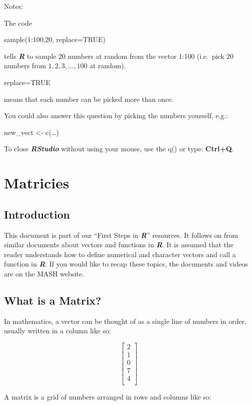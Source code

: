 \documentclass[
]{book}
\begin{document}
Notes:

The code

sample(1:100,20, replace=TRUE)

tells \textbf{\emph{R}} to sample \(20\) numbers at random from the vector 1:100 (i.e.~pick \(20\) numbers from \(1, 2, 3, \ldots , 100\) at random).

replace=TRUE

means that each number can be picked more than once.

You could also answer this question by picking the numbers yourself, e.g.:

new\_vect \textless- c(\ldots)

To close \textbf{\emph{RStudio}} without using your mouse, use the q() or type: \textbf{Ctrl+Q}.

\chapter{Matricies}\label{matricies}

\section{Introduction}\label{introduction-4}

This document is part of our ``First Steps in \textbf{\emph{R}}'' resources. It follows on from similar documents about vectors and functions in \textbf{\emph{R}}. It is assumed that the reader understands how to define numerical and character vectors and call a function in \textbf{\emph{R}}. If you would like to recap these topics, the documents and videos are on the MASH website.

\section{What is a Matrix?}\label{what-is-a-matrix}

In mathematics, a vector can be thought of as a single line of numbers in order, usually written in a column like so:

\[
\begin{bmatrix}
2 \\
1 \\
0 \\
7 \\
4 \\
\end{bmatrix}
\]

A matrix is a grid of numbers arranged in rows and columns like so:
\end{document}
